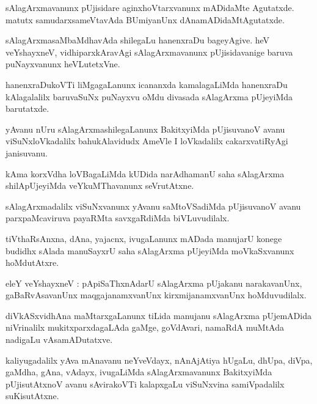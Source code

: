 \documentclass{article}
\begin{document}
\begin{mn}
sAlagArxmavanunx pUjisidare aginxhoVtarxvanunx mADidaMte Agutatxde. matutx samudarxsameVtavAda 
BUmiyanUnx dAnamADidaMtAgutatxde.
\end{mn}

\begin{mn}
sAlagArxmasaMbaMdhavAda shilegaLu hanenxraDu bageyAgive. heV veYshayxneV, vidhiparxkAravAgi 
sAlagArxmavanunx pUjisidavanige baruva puNayxvanunx heVLutetxVne.
\end{mn}

\begin{mn}
hanenxraDukoVTi liMgagaLanunx icananxda kamalagaLiMda hanenxraDu kAlagalalilx baruvaSuNx puNayxvu 
oMdu divasada sAlagArxma pUjeyiMda barutatxde. 
\end{mn}

\begin{mn}
yAvanu nUru sAlagArxmashilegaLanunx BakitxyiMda pUjisuvanoV avanu viSuNxloVkadalilx  bahukAlavidudx 
AmeVle I loVkadalilx cakarxvatiRyAgi janisuvanu.
\end{mn}

\begin{mn}
kAma korxVdha loVBagaLiMda kUDida narAdhamanU saha sAlagArxma shilApUjeyiMda veYkuMThavanunx 
seVrutAtxne.
\end{mn}

\begin{mn}
sAlagArxmadalilx viSuNxvanunx yAvanu saMtoVSadiMda pUjisuvanoV avanu
parxpaMcaviruva payaRMta savxgaRdiMda biVLuvudilalx.
\end{mn}

\begin{mn}
tiVthaRsAnxna, dAna, yajacnx, ivugaLanunx mADada manujarU konege budidhx 
sAlada manuSayxrU saha sAlagArxma pUjeyiMda moVkaSxvanunx hoMdutAtxre.
\end{mn}

\begin{mn}
eleY veYshayxneV : pApiSaThxnAdarU sAlagArxma pUjakanu narakavanUnx, gaBaRvAsavanUnx 
maqgajanamxvanUnx kirxmijanamxvanUnx hoMduvudilalx.
\end{mn}

\begin{mn}
diVkASxvidhAna maMtarxgaLanunx tiLida manujanu sAlagArxma pUjemADida niVrinalilx 
mukitxparxdagaLAda gaMge, goVdAvari, namaRdA muMtAda nadigaLu vAsamADutatxve.
\end{mn}

\begin{mn}
kaliyugadalilx yAva mAnavanu neYveVdayx, nAnAjAtiya hUgaLu, dhUpa, diVpa, gaMdha, gAna, vAdayx, 
ivugaLiMda sAlagArxmavanunx BakitxyiMda pUjisutAtxnoV avanu sAvirakoVTi kalapxgaLu viSuNxvina 
samiVpadalilx suKisutAtxne.
\end{mn}
\end{document}

